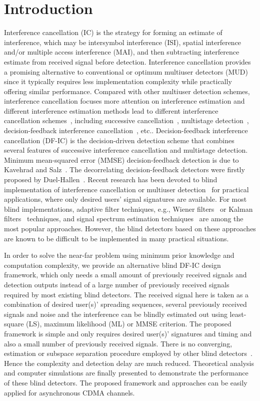 \documentclass[a4paper,10pt,fleqn, twocolumn]{IEEETran}
\begin{document}
\section{Introduction}
Interference cancellation (IC) is the strategy for forming an
estimate of interference, which may be intersymbol interference
(ISI), spatial interference and/or multiple access interference
(MAI), and then subtracting interference estimate from received
signal before detection. Interference cancellation provides a
promising alternative to conventional or optimum multiuser
detectors (MUD) since it typically requires less implementation
complexity while practically offering similar performance.
Compared with other multiuser detection schemes, interference
cancellation focuses more attention on interference estimation and
different interference estimation methods lead to different
interference cancellation schemes~\cite{Verd98,Wang02b}, including
successive cancellation~\cite{Kohno91}, multistage
detection~\cite{Vara88}, decision-feedback interference
cancellation~\cite{Kave85,Duel93,Duel95}, etc.. Decision-feedback
interference cancellation (DF-IC) is the decision-driven detection
scheme that combines several features of successive interference
cancellation and multistage detection. Minimum mean-squared error
(MMSE) decision-feedback detection is due to Kavehrad and
Salz~\cite{Kave85}. The decorrelating decision-feedback detectors
were firstly proposed by Duel-Hallen~\cite{Duel93,Duel95}.  Recent
research has been devoted to blind implementation of interference
cancellation or multiuser
detection~\cite{Madh94,Wang98,Wang99B,Zhang02} for practical
applications, where only desired users' signal signatures are
available. For most blind implementations, adaptive filter
techniques, e.g., Wiener filters~\cite{Madh94} or Kalman
filters~\cite{Zhang02} techniques, and signal spectrum estimation
techniques~\cite{Wang98,Wang99} are among the most popular
approaches. However, the blind detectors based on these approaches
are known to be difficult to be implemented in many practical
situations.

In order to solve the near-far problem using minimum prior
knowledge and computation complexity, we provide an alternative
blind DF-IC design framework, which only needs a small amount of
previously received signals and detection outputs instead of a
large number of previously received signals required by most
existing blind detectors. The received signal here is taken as a
combination of desired user(s)' spreading sequences, several
previously received signals and noise and the interference can be
blindly estimated out using least-square (LS), maximum likelihood
(ML) or MMSE criterion. The proposed framework is simple and only
requires desired user(s)' signatures and timing and also a small
number of previously received signals. There is no converging,
estimation or subspace separation procedure employed by other
blind detectors~\cite{Madh94,Honi95,Wang98,Wang99}. Hence the
complexity and detection delay are much reduced. Theoretical
analysis and computer simulations are finally presented to
demonstrate the performance of these blind detectors. The proposed
framework and approaches can be easily applied for asynchronous
CDMA channels.
\end{document}

